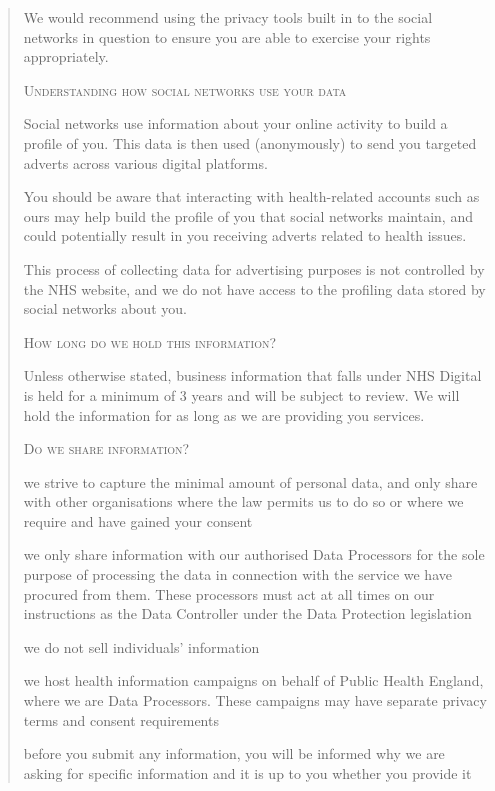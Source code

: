 \documentclass[twocolumn, letterpaper,13pt]{scrartcl}
\begin{document}
\begin{quote}
        We would recommend using the privacy tools built in to the social networks in question to ensure you are able to exercise your rights appropriately.
        
        \textsc{Understanding how social networks use your data}
        
        Social networks use information about your online activity to build a profile of you. This data is then used (anonymously) to send you targeted adverts across various digital platforms.
        
        You should be aware that interacting with health-related accounts such as ours may help build the profile of you that social networks maintain, and could potentially result in you receiving adverts related to health issues.
        
        This process of collecting data for advertising purposes is not controlled by the NHS website, and we do not have access to the profiling data stored by social networks about you.
        
        \textsc{How long do we hold this information?}
        
        Unless otherwise stated, business information that falls under NHS Digital is held for a minimum of 3 years and will be subject to review. We will hold the information for as long as we are providing you services.
        
        \textsc{Do we share information?}
        
        we strive to capture the minimal amount of personal data, and only share with other organisations where the law permits us to do so or where we require and have gained your consent
        
        we only share information with our authorised Data Processors for the sole purpose of processing the data in connection with the service we have procured from them. These processors must act at all times on our instructions as the Data Controller under the Data Protection legislation
        
        we do not sell individuals' information
        
        we host health information campaigns on behalf of Public Health England, where we are Data Processors. These campaigns may have separate privacy terms and consent requirements
        
        before you submit any information, you will be informed why we are asking for specific information and it is up to you whether you provide it
        

\end{quote}
\end{document}
